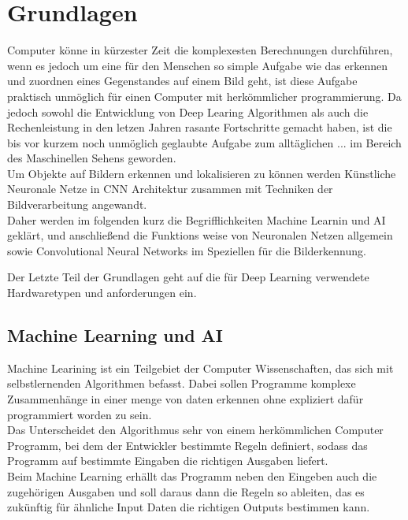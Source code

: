 \chapter{Grundlagen}\label{kap:grundlagen}


Computer könne in kürzester Zeit die komplexesten Berechnungen 
durchführen, wenn es jedoch um eine für den Menschen so 
simple Aufgabe wie das erkennen und zuordnen eines Gegenstandes
auf einem Bild geht, ist diese Aufgabe praktisch 
unmöglich für einen Computer mit herkömmlicher programmierung. 
Da jedoch sowohl die Entwicklung von Deep Learing Algorithmen 
als auch die Rechenleistung in den letzen Jahren rasante 
Fortschritte gemacht haben, ist die bis vor kurzem 
noch unmöglich geglaubte Aufgabe zum alltäglichen ... 
im Bereich des Maschinellen Sehens geworden.\\

Um Objekte auf Bildern erkennen und lokalisieren zu können 
werden Künstliche Neuronale Netze in CNN Architektur 
zusammen mit Techniken der Bildverarbeitung angewandt.\\

Daher werden im folgenden kurz die Begrifflichkeiten Machine 
Learnin und AI geklärt, und anschließend die Funktions
weise von Neuronalen Netzen allgemein sowie Convolutional 
Neural Networks im Speziellen für die Bilderkennung.

Der Letzte Teil der Grundlagen geht auf die für Deep 
Learning verwendete Hardwaretypen und anforderungen ein.




\section{Machine Learning und AI}\label{sec:ml}


Machine Learining ist ein Teilgebiet der Computer Wissenschaften, 
das sich mit selbstlernenden Algorithmen befasst. Dabei sollen 
Programme komplexe Zusammenhänge in einer menge von daten 
erkennen ohne expliziert dafür programmiert worden zu sein.
\\
Das Unterscheidet den Algorithmus sehr von einem herkömmlichen 
Computer Programm, bei dem der Entwickler bestimmte Regeln 
definiert, sodass das Programm auf bestimmte Eingaben 
die richtigen Ausgaben liefert.
\\
Beim Machine Learning erhällt das Programm neben den 
Eingeben auch die zugehörigen Ausgaben und soll daraus 
dann die Regeln so ableiten, das es zukünftig für ähnliche 
Input Daten die richtigen Outputs bestimmen kann.

